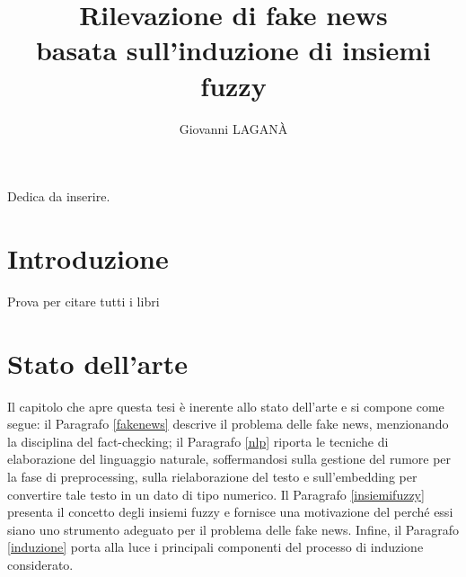 \documentclass[12pt]{report}
\theoremstyle{definition}
\begin{document}
\title{Rilevazione di fake news\\ basata sull'induzione di insiemi fuzzy}
\author{Giovanni LAGANÀ}
%
%
%
\beforepreface
        {\hfill \Large {\sl \begin{flushright} Dedica da inserire.         
\end{flushright}         }}
%
%
%
%
\afterpreface

%
%

\chapter*{Introduzione}
  
\onehalfspacing

Prova per citare tutti i libri
\cite{1,2,3,4,5,6,7,8,9,10,11,12,13,14,15,16,17,18,19,20,21,22}


\chapter{Stato dell'arte}
\label{Capitolo 1}
\onehalfspacing

Il capitolo che apre questa tesi è inerente allo stato dell'arte e si compone come segue: il Paragrafo \ref{fakenews} descrive il problema delle fake news, menzionando la disciplina del fact-checking; il Paragrafo \ref{nlp} riporta le tecniche di elaborazione del linguaggio naturale, soffermandosi sulla gestione del rumore per la fase di preprocessing, sulla rielaborazione del testo e sull'embedding per convertire tale testo in un dato di tipo numerico. 
Il Paragrafo \ref{insiemifuzzy} presenta il concetto degli insiemi fuzzy e fornisce una motivazione del perché essi siano uno strumento adeguato per il problema delle fake news.
Infine, il Paragrafo \ref{induzione} porta alla luce i principali componenti del processo di induzione considerato.
\end{document}
